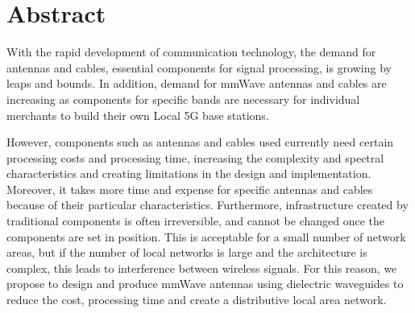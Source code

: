 \documentclass[a4paper,12pt]{report}
\begin{document}
\pagestyle{empty}

\begin{center}
  \end{center}
  
  
  \newpage

\renewcommand{\thepage}{\roman{page}}

\cleardoublepage
\pagestyle{fancy} %
\lhead{\rightmark}

\chapter*{\centering Abstract}

With the rapid development of communication technology, the demand
for antennas and cables, essential components for signal processing,
is growing by leaps and
bounds.
In addition,
demand for mmWave antennas and cables are increasing as
components for specific bands are necessary for individual
merchants to build their own Local 5G base stations.

However, components such as antennas and cables used
currently need certain
processing costs and processing time,
increasing the complexity and spectral characteristics
and creating limitations in the design and implementation.
Moreover, it takes
more time and expense for specific antennas and cables
because of their particular
characteristics.
Furthermore, infrastructure created by traditional components
is often irreversible, and cannot be changed once
the components are set in position.
This is acceptable for a small number of network areas, but if the number
of local networks is large and the architecture is complex,
this leads to interference between wireless signals.
For this reason, we propose to design and produce
mmWave antennas using dielectric waveguides to reduce the cost,
processing time
and create a distributive local area network.
\end{document}
